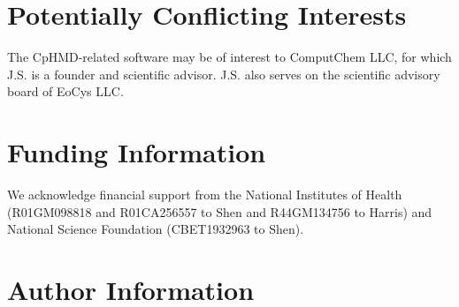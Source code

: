 \documentclass[9pt,tutorial]{livecoms}
\begin{document}
\section{Potentially Conflicting Interests}
The CpHMD-related software may be of interest to ComputChem LLC, for which
J.S. is a founder and scientific advisor. 
J.S. also serves on the scientific advisory board of EoCys LLC.

\section{Funding Information}
We acknowledge financial support from the National Institutes of Health (R01GM098818 and R01CA256557 to Shen and R44GM134756 to Harris) and National Science Foundation (CBET1932963 to Shen).

\section*{Author Information}
\makeorcid




\end{document}
